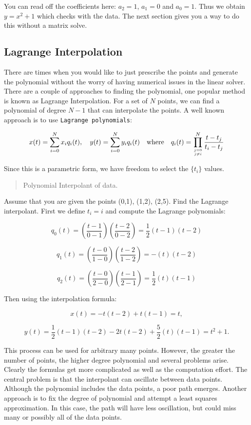You can read off the coefficients here: \(a_2=1\), \(a_1=0\) and
\(a_0=1\). Thus we obtain \(y = x^2 +1\) which checks with the data. The
next section gives you a way to do this without a matrix solve.

\hypertarget{lagrange-interpolation}{%
\subsection{Lagrange Interpolation}\label{lagrange-interpolation}}

There are times when you would like to just prescribe the points and
generate the polynomial without the worry of having numerical issues in
the linear solver. There are a couple of approaches to finding the
polynomial, one popular method is known as Lagrange Interpolation. For a
set of \(N\) points, we can find a polynomial of degree \(N-1\) that can
interpolate the points. A well known approach is to use
\texttt{Lagrange\ polynomials}:

\[x(t) = \sum_{i=0}^{N} x_i q_i(t), \quad y(t) = \sum_{i=0}^{N} y_i q_i(t)
\quad \mbox{where}\quad
 q_i(t) = \prod_{j =0 \atop j \neq i}^N \frac{t-t_j}{t_i-t_j}\]

Since this is a parametric form, we have freedom to select the
\(\{ t_i \}\) values.

\begin{quote}
Polynomial Interpolant of data.
\end{quote}

Assume that you are given the points (0,1), (1,2), (2,5). Find the
Lagrange interpolant. First we define \(t_i = i\) and compute the
Lagrange polynomials:

\[q_0(t) = \left(\frac{t-1}{0-1}\right) \left(\frac{t-2}{0-2}\right) = \frac{1}{2} (t-1)(t-2)\]

\[q_1(t) =  \left(\frac{t-0}{1-0}\right) \left(\frac{t-2}{1-2}\right) =  -(t)(t-2)\]

\[q_2(t) =  \left(\frac{t-0}{2-0}\right) \left(\frac{t-1}{2-1}\right) = \frac{1}{2} (t)(t-1)\]

Then using the interpolation formula:

\[x(t) = -t(t-2) + t(t-1)  = t,\]

\[y(t) =  \frac{1}{2} (t-1)(t-2) - 2t(t-2) + \frac{5}{2} (t)(t-1)= t^2+1 .\]

This process can be used for arbitrary many points. However, the greater
the number of points, the higher degree polynomial and several problems
arise. Clearly the formulas get more complicated as well as the
computation effort. The central problem is that the interpolant can
oscillate between data points. Although the polynomial includes the data
points, a poor path emerges. Another approach is to fix the degree of
polynomial and attempt a least squares approximation. In this case, the
path will have less oscillation, but could miss many or possibly all of
the data points.

